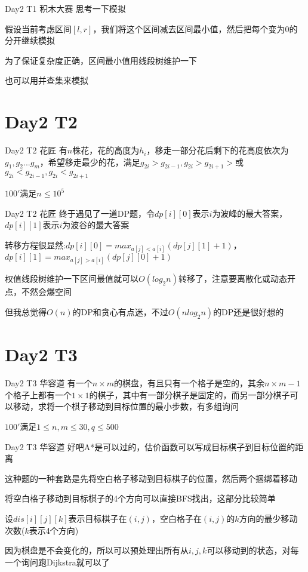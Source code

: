 \documentclass[10pt]{beamer}
\begin{document}
  \begin{frame}{Day2 T1 积木大赛} 
     思考一下模拟
    
     假设当前考虑区间$[l,r]$，我们将这个区间减去区间最小值，然后把每个变为0的分开继续模拟

     为了保证复杂度正确，区间最小值用线段树维护一下

     也可以用并查集来模拟
  \end{frame}

  \section{Day2 T2}

  \begin{frame}{Day2 T2 花匠} 
     有$n$株花，花的高度为$h_i$，移走一部分花后剩下的花高度依次为$g_1,g_2...g_m$，希望移走最少的花，满足$g_{2i}>g_{2i-1},g_{2i}>g_{2i+1}>$或$g_{2i}<g_{2i-1},g_{2i}<g_{2i+1}$

     $100'$满足$n\leq 10^5$
  \end{frame}

  \begin{frame}{Day2 T2 花匠} 
     终于遇见了一道DP题，令$dp[i][0]$表示$i$为波峰的最大答案，$dp[i][1]$表示$i$为波谷的最大答案

     转移方程很显然:$dp[i][0]=max_{a[j]<a[i]}(dp[j][1]+1)$，$dp[i][1]=max_{a[j]>a[i]}(dp[j][0]+1)$

     权值线段树维护一下区间最值就可以$O(log_2 n)$转移了，注意要离散化或动态开点，不然会爆空间

     但我总觉得$O(n)$的DP和贪心有点迷，不过$O(nlog_2n)$的DP还是很好想的
  \end{frame}

  \section{Day2 T3}

  \begin{frame}{Day2 T3 华容道} 
     有一个$n\times m$的棋盘，有且只有一个格子是空的，其余$n\times m-1$个格子上都有一个$1\times 1$的棋子，其中有一部分棋子是固定的，而另一部分棋子可以移动，求将一个棋子移动到目标位置的最小步数，有多组询问

     $100'$满足$1\leq n,m\leq 30,q\leq 500$
  \end{frame}

  \begin{frame}{Day2 T3 华容道} 
     好吧A*是可以过的，估价函数可以写成目标棋子到目标位置的距离

     这种题的一种套路是先将空白格子移动到目标棋子的位置，然后两个捆绑着移动

     将空白格子移动到目标棋子的4个方向可以直接BFS找出，这部分比较简单

     设$dis[i][j][k]$表示目标棋子在$(i,j)$，空白格子在$(i,j)$的$k$方向的最少移动次数($k$表示4个方向)
    
     因为棋盘是不会变化的，所以可以预处理出所有从$i,j,k$可以移动到的状态，对每一个询问跑Dijkstra就可以了
  \end{frame}
\end{document}
